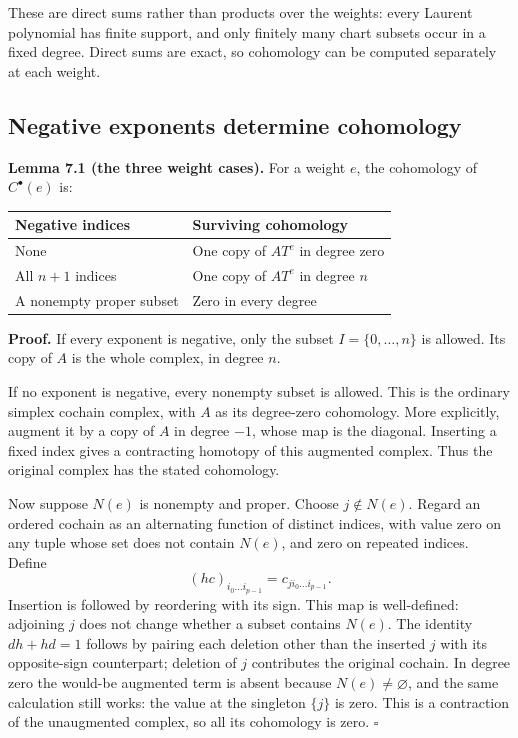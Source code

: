 \documentclass[11pt,a4paper,openany]{report}
\newcounter{none}
\begin{document}
These are direct sums rather than products over the weights: every Laurent polynomial has finite support, and only finitely many chart subsets occur in a fixed degree. Direct sums are exact, so cohomology can be computed separately at each weight.

\subsection{Negative exponents determine cohomology}\label{AG-RG-S01-negative-exponents-determine-cohomology}

\textbf{Lemma 7.1 (the three weight cases).} For a weight \(e\), the cohomology of \(C^\bullet(e)\) is:

{\def\LTcaptype{none} %
\begin{longtable}[]{@{}ll@{}}
\toprule\noalign{}
Negative indices & Surviving cohomology \\
\midrule\noalign{}
\endhead
\bottomrule\noalign{}
\endlastfoot
None & One copy of \(A T^e\) in degree zero \\
All \(n+1\) indices & One copy of \(A T^e\) in degree \(n\) \\
A nonempty proper subset & Zero in every degree \\
\end{longtable}
}

\textbf{Proof.} If every exponent is negative, only the subset \(I=\{0,\ldots,n\}\) is allowed. Its copy of \(A\) is the whole complex, in degree \(n\).

If no exponent is negative, every nonempty subset is allowed. This is the ordinary simplex cochain complex, with \(A\) as its degree-zero cohomology. More explicitly, augment it by a copy of \(A\) in degree \(-1\), whose map is the diagonal. Inserting a fixed index gives a contracting homotopy of this augmented complex. Thus the original complex has the stated cohomology.

Now suppose \(N(e)\) is nonempty and proper. Choose \(j\notin N(e)\). Regard an ordered cochain as an alternating function of distinct indices, with value zero on any tuple whose set does not contain \(N(e)\), and zero on repeated indices. Define \[
(hc)_{i_0\ldots i_{p-1}}=c_{j i_0\ldots i_{p-1}}.
\] Insertion is followed by reordering with its sign. This map is well-defined: adjoining \(j\) does not change whether a subset contains \(N(e)\). The identity \(dh+hd=1\) follows by pairing each deletion other than the inserted \(j\) with its opposite-sign counterpart; deletion of \(j\) contributes the original cochain. In degree zero the would-be augmented term is absent because \(N(e)\ne\varnothing\), and the same calculation still works: the value at the singleton \(\{j\}\) is zero. This is a contraction of the unaugmented complex, so all its cohomology is zero. \(\square\)
\end{document}
